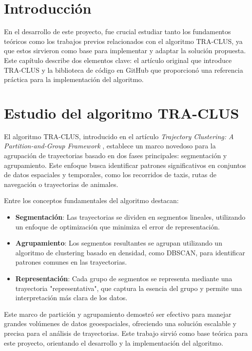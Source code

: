 
\section{Introducción}

En el desarrollo de este proyecto, fue crucial estudiar tanto los fundamentos teóricos como los trabajos previos relacionados con el algoritmo TRA-CLUS, ya que estos sirvieron como base para implementar y adaptar la solución propuesta. Este capítulo describe dos elementos clave: el artículo original que introduce TRA-CLUS y la biblioteca de código en GitHub que proporcionó una referencia práctica para la implementación del algoritmo.

\section{Estudio del algoritmo TRA-CLUS}

El algoritmo TRA-CLUS, introducido en el artículo \emph{Trajectory Clustering: A Partition-and-Group Framework} \cite{lee2007trajectory}, establece un marco novedoso para la agrupación de trayectorias basado en dos fases principales: segmentación y agrupamiento. Este enfoque busca identificar patrones significativos en conjuntos de datos espaciales y temporales, como los recorridos de taxis, rutas de navegación o trayectorias de animales.

Entre los conceptos fundamentales del algoritmo destacan:

\begin{itemize}
    \item \textbf{Segmentación}: Las trayectorias se dividen en segmentos lineales, utilizando un enfoque de optimización que minimiza el error de representación.
    \item \textbf{Agrupamiento}: Los segmentos resultantes se agrupan utilizando un algoritmo de clustering basado en densidad, como DBSCAN, para identificar patrones comunes en las trayectorias.
    \item \textbf{Representación}: Cada grupo de segmentos se representa mediante una trayectoria "representativa", que captura la esencia del grupo y permite una interpretación más clara de los datos.
\end{itemize}

Este marco de partición y agrupamiento demostró ser efectivo para manejar grandes volúmenes de datos geoespaciales, ofreciendo una solución escalable y precisa para el análisis de trayectorias. Este trabajo sirvió como base teórica para este proyecto, orientando el desarrollo y la implementación del algoritmo.

